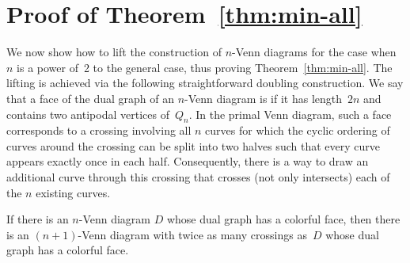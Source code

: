 \section{Proof of Theorem~\ref{thm:min-all}}
%
We now show how to lift the construction of $n$-Venn diagrams for the case when $n$ is a power of~2 to the general case, thus proving Theorem~\ref{thm:min-all}.
The lifting is achieved via the following straightforward doubling construction.
%
We say that a face of the dual graph of an $n$-Venn diagram is  if it has length~$2n$ and contains two antipodal vertices of~$Q_n$.
In the primal Venn diagram, such a face corresponds to a crossing involving all $n$ curves for which the cyclic ordering of curves around the crossing can be split into two halves such that every curve appears exactly once in each half.
Consequently, there is a way to draw an additional curve through this crossing that crosses (not only intersects) each of the $n$ existing curves.
%
\begin{lemma}
\label{lem:doubling}
If there is an $n$-Venn diagram $D$ whose dual graph has a colorful face, then there is an $(n+1)$-Venn diagram with twice as many crossings as~$D$ whose dual graph has a colorful face.
\end{lemma}
%
